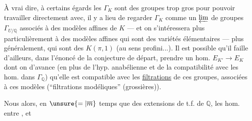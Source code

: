 À vrai dire, à certains égards les $\Gamma_K$ sont des groupes trop gros pour pouvoir travailler directement avec, il y a lieu de regarder $\Gamma_K$ comme un $\varprojlim$ de groupes $\Gamma_{U/\mathbb Q}$ associés à des modèles affines de $K$ --- et on s'intéressera plus particulièrement à des modèles affines qui sont des variétés élémentaires --- plus généralement, qui sont des $K(\pi,1)$ (au sens profini...). Il est possible qu'il faille d'ailleurs, dans l'énoncé de la conjecture de départ, prendre un hom.  $E_{K'}\longrightarrow E_K$ dont on  d'avance (en plus de l'hyp. anabélienne et de la compatibilité avec les hom. dans $\Gamma_{\mathbb Q}$) qu'elle est compatible avec les \uline{filtrations} de ces groupes, associées à ces modèles (``filtrations modéliques'' (grossières)).

Nous  alors, en $\unsure{=|\overline m}$ temps que des extensions de t.f. de $\mathbb Q$, les hom. entre , et
